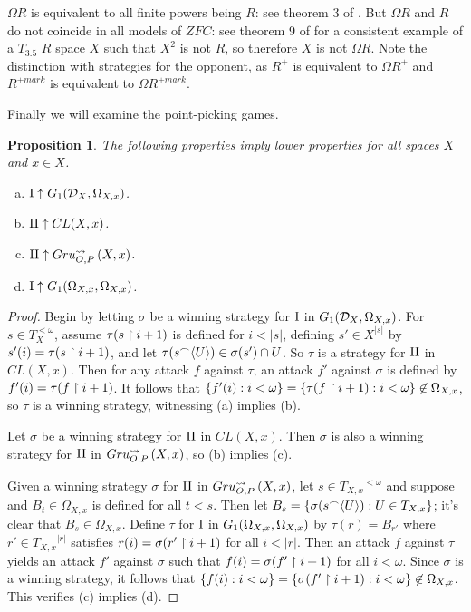 \documentclass{amsart}
\theoremstyle{plain}
\newtheorem{proposition}[theorem]{Proposition}
\theoremstyle{definition}
\theoremstyle{remark}
\theoremstyle{plain}
\theoremstyle{definition}
\theoremstyle{remark}
\begin{document}
\(\Omega R\) is equivalent to all finite powers being \(R\): see theorem 3 of \cite{Scheepers1997}. 
But \(\Omega R\) and \(R\) do not coincide in all models of \(ZFC\): see theorem 9 of \cite{BABINKOSTOVA2013} for a consistent example of a \(T_{3.5}\) \(R\) space \(X\) such that \(X^2\) is not \(R\), so therefore \(X\) is not \(\Omega R\). 
Note the distinction with strategies for the opponent, as \(R^+\) is equivalent to \(\Omega R^+\) and \(R^{+mark}\) is equivalent to \(\Omega R^{+mark}\).

Finally we will examine the point-picking games.

\begin{proposition}\label{lowerPropA}
The following properties imply lower properties for all spaces \(X\) and \(x\in X\).
 \begin{enumerate}[a)]
  \item \(\mathrm{I}\uparrow G_{1}(\mathcal{D}_X,\Omega_{X,x})\).
  \item \(\mathrm{II}\uparrow CL(X,x)\).
  \item \(\mathrm{II}\uparrow Gru_{O,P}^{\leadsto}\left({X},{x}\right)\).
  \item \(\mathrm{I}\uparrow G_{1}(\Omega_{X,x},\Omega_{X,x})\).
 \end{enumerate}
\end{proposition}
\begin{proof}
 Begin by letting \(\sigma\) be a winning strategy for \(\mathrm{I}\) in \(G_{1}(\mathcal{D}_X,\Omega_{X,x})\). 
 For \(s\in T_{X}^{<\omega}\), assume \(\tau(s\restriction i+1)\) is defined for \(i<|s|\), defining \(s'\in X^{|s|}\) by \(s'(i)=\tau(s\restriction i+1)\), and let \(\tau(s{^\frown}\langle U\rangle)\in\sigma(s')\cap U\). 
 So \(\tau\) is a strategy for \(\mathrm{II}\) in \(CL(X,x)\). Then for any attack \(f\) against \(\tau\), an attack \(f'\) against \(\sigma\) is defined by \(f'(i)=\tau(f\restriction i+1)\). 
 It follows that \(\{f'(i):i<\omega\}=\{\tau(f\restriction i+1):i<\omega\}\not\in\Omega_{X,x}\), so \(\tau\) is a winning strategy, witnessing (a) implies (b).

 Let \(\sigma\) be a winning strategy for \(\mathrm{II}\) in \(CL(X,x)\). 
 Then \(\sigma\) is also a winning strategy for \(\mathrm{II}\) in \(Gru_{O,P}^{\leadsto}\left({X},{x}\right)\), so (b) implies (c).

 Given a winning strategy \(\sigma\) for \(\mathrm{II}\) in \(Gru_{O,P}^{\leadsto}\left({X},{x}\right)\), let \(s\in {T_{X,x}}^{<\omega}\) and suppose and \(B_t\in\Omega_{X,x}\) is defined for all \(t<s\). 
 Then let \(B_s=\{\sigma(s{^\frown}\langle U\rangle):U\in T_{X,x}\}\); it's clear that \(B_s\in\Omega_{X,x}\). 
 Define \(\tau\) for \(\mathrm{I}\) in \(G_{1}(\Omega_{X,x},\Omega_{X,x})\) by \(\tau(r)=B_{r'}\) where \(r'\in {T_{X,x}}^{|r|}\) satisfies \(r(i)=\sigma(r'\restriction i+1)\) for all \(i<|r|\). 
 Then an attack \(f\) against \(\tau\) yields an attack \(f'\) against \(\sigma\) such that \(f(i)=\sigma(f'\restriction i+1)\) for all \(i<\omega\). 
 Since \(\sigma\) is a winning strategy, it follows that \(\{f(i):i<\omega\}=\{\sigma(f'\restriction i+1):i<\omega\}\not\in\Omega_{X,x}\). 
 This verifies (c) implies (d).
\end{proof}
\end{document}
